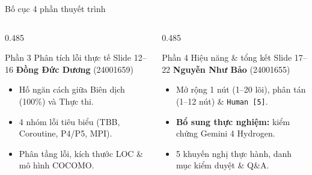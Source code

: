 \documentclass[aspectratio=169,10pt]{beamer}
\newcommand{\currentpart}{Mở đầu}
\newcommand{\setpart}[1]{\renewcommand{\currentpart}{#1}}
\newcommand{\code}[1]{\texttt{\color{BlueDark}#1}}
\begin{document}
\begin{frame}{Bố cục 4 phần thuyết trình}
\begin{columns}[T,totalwidth=\textwidth]
  \begin{column}{0.485\textwidth}
    \begin{bluebox}[height=2.95cm]{Phần 3 \;\textbullet\; Phân tích lỗi thực tế \hfill {\scriptsize Slide 12--16}}
      \textbf{\footnotesize Đồng Đức Dương} {\scriptsize(\color{Muted}24001659)}
      \begin{itemize}\scriptsize\setlength{\itemsep}{2pt}
        \item Hố ngăn cách giữa Biên dịch (100\%) và Thực thi.
        \item 4 nhóm lỗi tiêu biểu (TBB, Coroutine, P4/P5, MPI).
        \item Phân tầng lỗi, kích thước LOC \& mô hình COCOMO.
      \end{itemize}
    \end{bluebox}
  \end{column}
  \begin{column}{0.485\textwidth}
    \begin{bluebox}[height=2.95cm]{Phần 4 \;\textbullet\; Hiệu năng \& tổng kết \hfill {\scriptsize Slide 17--22}}
      \textbf{\footnotesize Nguyễn Như Bảo} {\scriptsize(\color{Muted}24001655)}
      \begin{itemize}\scriptsize\setlength{\itemsep}{2pt}
        \item Mở rộng 1 nút (1--20 lõi), phân tán (1--12 nút) \& \code{Human [5]}.
        \item \textbf{Bổ sung thực nghiệm:} kiểm chứng Gemini 4 Hydrogen.
        \item 5 khuyến nghị thực hành, danh mục kiểm duyệt \& Q\&A.
      \end{itemize}
    \end{bluebox}
  \end{column}
\end{columns}
\end{frame}

\setpart{Phần 1 \textbullet{} Trần Lý Dũng}
\end{document}
